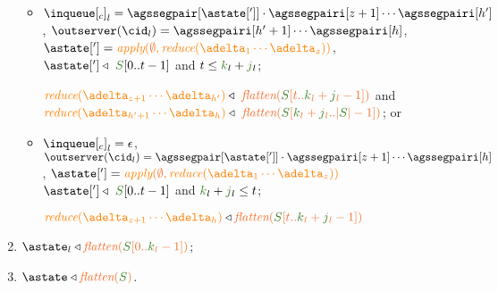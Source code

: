 \begin{definition}
\begin{enumerate}
\begin{itemize}
     \item ${\inclient}_l = \agssegpair[{\astate[']}]\cdot\agssegpairi[{z+1}] \cdots \agssegpairi[h']$, 
              $\outserver(\cid_l) = \agssegpairi[h'+1] \cdots \agssegpairi[h]$,
     		$\astate['] = \iapply{\initialstate}{\ireduce{\adelta_1\cdots\adelta_{z}}}$,
               $\astate['] \triangleleft \ \queuemessage[0 .. t - 1]$ and $t \leq \tknown_l+\treceivebuffer_l$; 

     
     $\ireduce{\adelta_{z+1}\cdots\adelta_{h'}}\triangleleft \ \flatten{ \queuemessage[t..\tknown_l+\treceivebuffer_l-1]}$ and 
     $\ireduce{\adelta_{h'+1}\cdots\adelta_h}\triangleleft \
       \flatten{\queuemessage[\tknown_l+\treceivebuffer_l..|\queuemessage| - 1]}$; or
     
       
     \item ${\inclient}_l = \epsilon$, 
     $\outserver(\cid_l) = \agssegpair[{\astate[']}]\cdot\agssegpairi[z+1] \cdots \agssegpairi[h]$, 
     $\astate['] = \iapply{\initialstate}{\ireduce{\adelta_1\cdots\adelta_{z}}}$
      $\astate['] \triangleleft \ \queuemessage[0 .. t - 1]$ and $\tknown_l+\treceivebuffer_l \leq t$; 
     
     $\ireduce{\adelta_{z+1}\cdots\adelta_{h}}\triangleleft \flatten{ \queuemessage[t..\tknown_l+\treceivebuffer_l-1]}$ 
     
     
    \end{itemize}



	\item \label{prop_state_known} $\astate_l \triangleleft \flatten {\queuemessage[0 .. \tknown_l - 1]}$;
	
	\item \label{prop_stateserver} $\astate \triangleleft \flatten{\queuemessage}$.
	
	                                    



\end{enumerate}
\end{definition}
